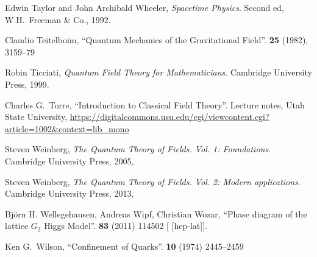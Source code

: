 \begin{thebibliography}{99}
Edwin Taylor and John Archibald Wheeler,
\textit{Spacetime Physics}.
Second ed, W.H.~Freeman \& Co., 1992.

Claudio Teitelboim,
``Quantum Mechanics of the Gravitational Field''.
 \textbf{25} (1982), 3159--79
{\tt{}}

Robin Ticciati,
\textit{Quantum Field Theory for Mathematicians}.
Cambridge University Press, 1999.

Charles G.~Torre,
``Introduction to Classical Field Theory''.
Lecture notes, Utah State University,
\url{https://digitalcommons.usu.edu/cgi/viewcontent.cgi?article=1002&context=lib_mono}

Steven Weinberg,
\textit{The Quantum Theory of Fields. Vol. 1: Foundations}.
Cambridge University Press, 2005,
{\tt{}}

Steven Weinberg,
\textit{The Quantum Theory of Fields. Vol. 2: Modern applications}.
Cambridge University Press, 2013,
{\tt{}}

Bj\"{o}rn H. Wellegehausen, Andreas Wipf, Christian Wozar,
``Phase diagram of the lattice $G_2$ Higgs Model''.
 \textbf{83} (2011) 114502
{\tt{}}
[ [hep-lat]].

Ken G.~Wilson,
``Confinement of Quarks''.
 \textbf{10} (1974) 2445--2459
{\tt{}}

\end{thebibliography}

